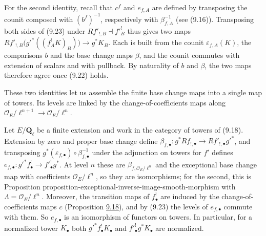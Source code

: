 \documentclass[11pt]{article}
\begin{document}
For the second identity, recall that \(c^f\) and \(e_{f,A}\) are defined by transposing the counit composed with \((b^f)^{-1}\), respectively with \(\beta_{f,A}^{-1}\) (see (9.16)). Transposing both sides of (9.23) under \(Rf'_{!,B}\dashv f'^!_B\) thus gives two maps \(Rf'_{!,B}\bigl(g'^*((f_A^!K)_B)\bigr)\to g^*K_B\). Each is built from the counit \(\varepsilon_{f,A}(K)\), the comparisons \(b\) and the base change maps \(\beta\), and the counit commutes with extension of scalars and with pullback. By naturality of \(b\) and \(\beta\), the two maps therefore agree once (9.22) holds.

These two identities let us assemble the finite base change maps into a single map of towers. Its levels are linked by the change-of-coefficients maps along \(\mathcal O_E/\ell^{n+1}\to\mathcal O_E/\ell^n\).

Let \(E/\mathbf Q_\ell\) be a finite extension and work in the category of towers of (9.18). Extension by zero and proper base change define \(\beta_{f,\bullet}:g^*Rf_{!,\bullet}\to Rf'_{!,\bullet}g'^*\), and transposing \(g^*(\varepsilon_{f,\bullet})\circ\beta_{f,\bullet}^{-1}\) under the adjunction on towers for \(f'\) defines \(e_{f,\bullet}:g'^*f_\bullet^!\to f'^!_\bullet g^*\). At level \(n\) these are \(\beta_{f,\mathcal O_E/\ell^n}\) and the exceptional base change map with coefficients \(\mathcal O_E/\ell^n\), so they are isomorphisms; for the second, this is Proposition proposition-exceptional-inverse-image-smooth-morphism with \(\Lambda=\mathcal O_E/\ell^n\). Moreover, the transition maps of \(f_\bullet^!\) are induced by the change-of-coefficients maps \(c\) (Proposition \hyperref[bp60]{9.18}), and by (9.23) the levels of \(e_{f,\bullet}\) commute with them. So \(e_{f,\bullet}\) is an isomorphism of functors on towers. In particular, for a normalized tower \(K_\bullet\) both \(g'^*f_\bullet^!K_\bullet\) and \(f'^!_\bullet g^*K_\bullet\) are normalized.
\end{document}
